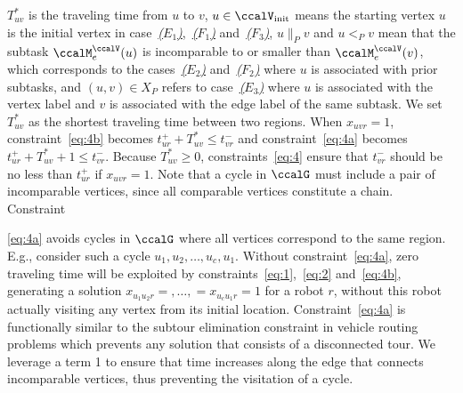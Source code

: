 \documentclass[Afour,sageh,times]{sagej}
\begin{document}
{$T^*_{uv}$ is the traveling time from $u$ to $v$, $u \in \ccalV_{\text{init}}$ means the starting vertex $u$ is the initial vertex in case~\hyperref[sec:a]{{\it ($E_1$)}},~\hyperref[edge:vertex1]{{\it ($F_1$)}} and~\hyperref[edge:vertex3]{{\it ($F_3$)}}, $u \|_{P} v$ and $u<_{P} v$ mean that the subtask $\ccalM^\ccalV_{{e}}(u)$ is incomparable to or smaller than $\ccalM^\ccalV_e(v)$, which corresponds to the cases~\hyperref[sec:b]{{\it ($E_2$)}} and~\hyperref[edge:vertex2]{{\it ($F_2$)}} where $u$ is associated with prior subtasks, and $(u,v)\in X_P$ refers to case~\hyperref[sec:c]{{\it ($E_3$)}} where $u$ is associated with the vertex label and $v$ is associated with the edge label of the same subtask. We set $T^*_{uv}$ as the shortest traveling time between two regions. When $x_{uvr}=1$, constraint~\eqref{eq:4b} becomes $t_{ur}^+  + T^*_{uv}  \leq t_{vr}^-$ and constraint~\eqref{eq:4a} becomes $t_{ur}^+  + T^*_{uv} + 1   \leq t_{vr}^-$. Because $T^*_{uv} \geq 0$, constraints~\eqref{eq:4} ensure that $t_{vr}^-$ should be no less than $t_{ur}^+$ if $x_{uvr}=1$. Note that a cycle in $\ccalG$ must include a pair of incomparable vertices, since all comparable vertices constitute a chain. Constraint~{\eqref{eq:4a} avoids cycles in $\ccalG$ where all vertices correspond to the same region. E.g., consider such a cycle $u_1,u_2,\ldots, u_c, u_1$. Without  constraint~\eqref{eq:4a}, zero traveling time will be exploited by constraints~\eqref{eq:1},~\eqref{eq:2} and~\eqref{eq:4b}, generating a solution $x_{u_1 u_2 r} = ,\ldots,=x_{u_c u_{1} r}= 1$ for a robot $r$, without this robot actually visiting any vertex from its initial location.  Constraint~\eqref{eq:4a} is functionally similar to the subtour elimination constraint in vehicle routing problems which prevents any solution that consists of a disconnected tour. We leverage a  term 1 to ensure that time increases along the edge that connects incomparable vertices, thus preventing the visitation of a cycle.

}}
\end{document}
